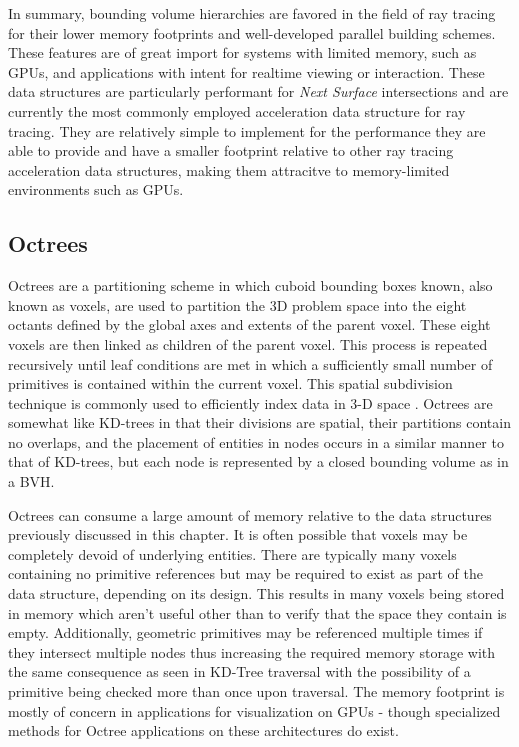 In summary, bounding volume hierarchies are favored in the field of ray tracing
for their lower memory footprints and well-developed parallel building
schemes. These features are of great import for systems with limited memory,
such as GPUs, and applications with intent for realtime viewing or
interaction. These data structures are particularly performant for \textit{Next
  Surface} intersections and are currently the most commonly employed
acceleration data structure for ray tracing. They are relatively simple to
implement for the performance they are able to provide and have a smaller
footprint relative to other ray tracing acceleration data structures,
making them attracitve to memory-limited environments such as GPUs.

\subsection{Octrees}%
\label{subsec:octree}

Octrees are a partitioning scheme in which cuboid bounding boxes known, also
known as voxels, are used to partition the 3D problem space into the eight
octants defined by the global axes and extents of the parent voxel. These eight
voxels are then linked as children of the parent voxel. This process is repeated
recursively until leaf conditions are met in which a sufficiently small number
of primitives is contained within the current voxel. This spatial subdivision
technique is commonly used to efficiently index data in 3-D space
\cite{Glassner_1989}. Octrees are somewhat like KD-trees in that their divisions
are spatial, their partitions contain no overlaps, and the placement of entities
in nodes occurs in a similar manner to that of KD-trees, but each node is
represented by a closed bounding volume as in a BVH.

Octrees can consume a large amount of memory relative to the data structures
previously discussed in this chapter. It is often possible that voxels may be
completely devoid of underlying entities. There are typically many voxels
containing no primitive references but may be required to exist as part of the
data structure, depending on its design. This results in many voxels being
stored in memory which aren't useful other than to verify that the space they
contain is empty. Additionally, geometric primitives may be referenced multiple
times if they intersect multiple nodes thus increasing the required memory
storage with the same consequence as seen in KD-Tree traversal with the
possibility of a primitive being checked more than once upon traversal. The
memory footprint is mostly of concern in applications for visualization on GPUs
- though specialized methods for Octree applications on these architectures do
exist.


